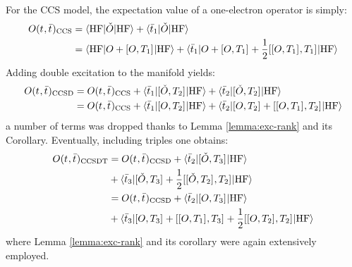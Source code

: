 For the \acrshort{CCS} model, the expectation value of a one-electron operator
is simply:
\begin{equation}\label{eq:ccs-expectation-value}
\begin{aligned}
  O(t_{}, \bar{t}_{})_\mathrm{CCS} &=
  \braket{\mathrm{HF} | \check{O} | \mathrm{HF} }
  + \braket{\bar{t}_{1} | \check{O} | \mathrm{HF} } \\
  &=
  \braket{\mathrm{HF} | O + [ O, T_1 ]^{} | \mathrm{HF} }
  + \braket{\bar{t}_{1} | O + [ O, T_1 ]^{}
  + \frac{1}{2}[ [ O, T_1 ]^{}, T_1 ]^{} | \mathrm{HF} }
\end{aligned}
\end{equation}
Adding double excitation to the manifold yields:
\begin{equation}\label{eq:ccsd-expectation-value}
  \begin{aligned}
  O(t_{}, \bar{t}_{})_\mathrm{CCSD}
  &=
    O(t_{}, \bar{t}_{})_\mathrm{CCS}
  + \braket{\bar{t}_{1} | [ \check{O}, T_2 ]^{} | \mathrm{HF} }
  + \braket{\bar{t}_{2} | [ \check{O}, T_2 ]^{} | \mathrm{HF} } \\
  &=
    O(t_{}, \bar{t}_{})_\mathrm{CCS}
  + \braket{\bar{t}_{1} | [ O, T_2 ]^{} | \mathrm{HF} }
  + \braket{\bar{t}_{2} | [ O, T_2 ]^{}
      + [ [ O, T_1 ]^{}, T_2 ]^{}
  | \mathrm{HF} }
  \end{aligned}
\end{equation}
a number of terms was dropped thanks to Lemma \ref{lemma:exc-rank} and its
Corollary.
Eventually, including triples one obtains:
\begin{equation}\label{eq:ccsdt-expectation-value}
\begin{aligned}
  O(t_{}, \bar{t}_{})_\mathrm{CCSDT}
  &=
    O(t_{}, \bar{t}_{})_\mathrm{CCSD}
  + \braket{\bar{t}_{2} | [ \check{O}, T_3 ]^{} | \mathrm{HF} } \\
  &+ \braket{\bar{t}_{3} | [ \check{O}, T_3 ]^{}
    + \frac{1}{2}[ [ \check{O}, T_2 ]^{}, T_2 ]^{}
  | \mathrm{HF} } \\
  &=
    O(t_{}, \bar{t}_{})_\mathrm{CCSD}
  + \braket{\bar{t}_{2} | [ O, T_3 ]^{} | \mathrm{HF} } \\
  &+ \braket{\bar{t}_{3} | [ O, T_3 ]^{}
    + [ [ O, T_1 ]^{}, T_3 ]^{}
    + \frac{1}{2}[ [ O, T_2 ]^{}, T_2 ]^{}
  | \mathrm{HF} }
\end{aligned}
\end{equation}
where Lemma \ref{lemma:exc-rank} and its corollary were again extensively employed.

